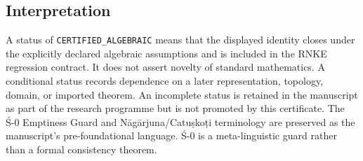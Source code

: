 \documentclass[12pt, oneside]{article}
\begin{document}
\subsection{Interpretation}
A status of \texttt{CERTIFIED\_ALGEBRAIC} means that the displayed identity closes under the explicitly declared algebraic assumptions and is included in the RNKE regression contract. It does not assert novelty of standard mathematics.
A conditional status records dependence on a later representation, topology, domain, or imported theorem. An incomplete status is retained in the manuscript as part of the research programme but is not promoted by this certificate.
The Ś-0 Emptiness Guard and Nāgārjuna/Catuṣkoṭi terminology are preserved as the manuscript's pre-foundational language. Ś-0 is a meta-linguistic guard rather than a formal consistency theorem.
\end{document}
